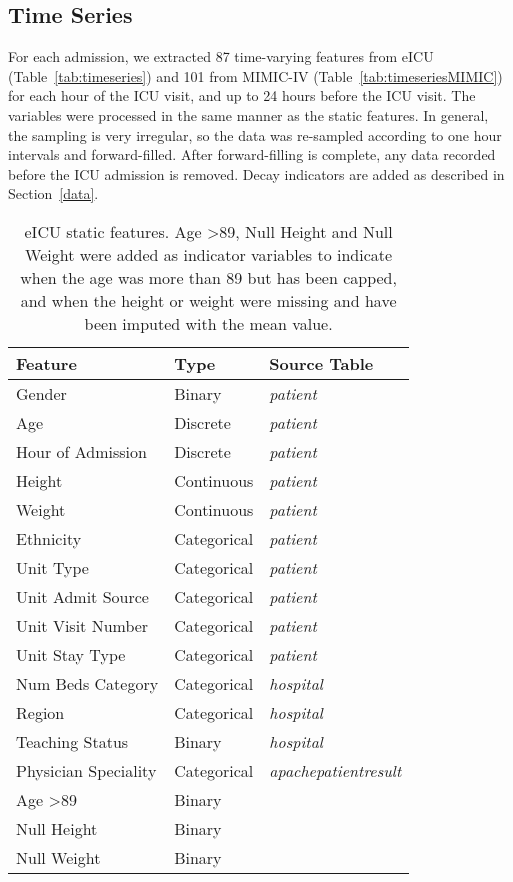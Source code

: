 \documentclass[sigconf]{acmart}
\begin{document}
\subsection{Time Series}
\label{timeseriespreproc}
For each admission, we extracted 87 time-varying features from eICU (Table~\ref{tab:timeseries}) and 101 from MIMIC-IV (Table~\ref{tab:timeseriesMIMIC}) for each hour of the ICU visit, and up to 24 hours before the ICU visit. The variables were processed in the same manner as the static features. In general, the sampling is very irregular, so the data was re-sampled according to one hour intervals and forward-filled. After forward-filling is complete, any data recorded before the ICU admission is removed. Decay indicators are added as described in Section~\ref{data}.

\begin{table}[h]
    \caption{eICU static features. Age \textgreater 89, Null Height and Null Weight were added as indicator variables to indicate when the age was more than 89 but has been capped, and when the height or weight were missing and have been imputed with the mean value.}
    \label{tab:static}
    \centering
    \begin{tabular}{lll}
        \toprule
        \textbf{Feature} & \textbf{Type} & \textbf{Source Table} \\
        \midrule
        Gender & Binary & \textit{patient} \\
        Age & Discrete & \textit{patient} \\
        Hour of Admission & Discrete & \textit{patient} \\
        Height & Continuous & \textit{patient} \\
        Weight & Continuous & \textit{patient} \\
        Ethnicity & Categorical & \textit{patient} \\
        Unit Type & Categorical & \textit{patient} \\
        Unit Admit Source & Categorical & \textit{patient} \\
        Unit Visit Number & Categorical & \textit{patient} \\
        Unit Stay Type & Categorical & \textit{patient} \\
        Num Beds Category & Categorical & \textit{hospital} \\
        Region & Categorical & \textit{hospital} \\
        Teaching Status & Binary & \textit{hospital} \\
        Physician Speciality & Categorical & \textit{apachepatientresult} \\
        Age \textgreater 89 & Binary & \\
        Null Height & Binary & \\
        Null Weight & Binary & \\
        \bottomrule
    \end{tabular}
\end{table}
\end{document}
